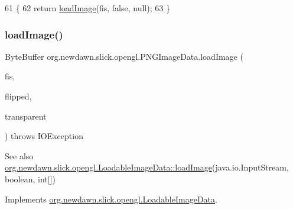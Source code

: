 \begin{DoxyCode}
61                                                                     \{
62         \textcolor{keywordflow}{return} \mbox{\hyperlink{classorg_1_1newdawn_1_1slick_1_1opengl_1_1_p_n_g_image_data_ad5507c5228d071b2936b8aa91f18e9e1}{loadImage}}(fis, \textcolor{keyword}{false}, null);
63     \}
\end{DoxyCode}
\mbox{\label{classorg_1_1newdawn_1_1slick_1_1opengl_1_1_p_n_g_image_data_a9a005163153012911fd6a209ae5f2613}} 
\subsubsection{\texorpdfstring{load\+Image()}{loadImage()}\hspace{0.1cm}{\footnotesize\ttfamily [2/3]}}
{\footnotesize\ttfamily Byte\+Buffer org.\+newdawn.\+slick.\+opengl.\+P\+N\+G\+Image\+Data.\+load\+Image (\begin{DoxyParamCaption}\item[{Input\+Stream}]{fis,  }\item[{boolean}]{flipped,  }\item[{int \mbox{[}$\,$\mbox{]}}]{transparent }\end{DoxyParamCaption}) throws I\+O\+Exception\hspace{0.3cm}{\ttfamily [inline]}}

\begin{DoxySeeAlso}{See also}
\mbox{\hyperlink{interfaceorg_1_1newdawn_1_1slick_1_1opengl_1_1_loadable_image_data_a640021b955dde7deeeeabb5ac3738d2b}{org.\+newdawn.\+slick.\+opengl.\+Loadable\+Image\+Data\+::load\+Image}}(java.\+io.\+Input\+Stream, boolean, int\mbox{[}\mbox{]}) 
\end{DoxySeeAlso}


Implements \mbox{\hyperlink{interfaceorg_1_1newdawn_1_1slick_1_1opengl_1_1_loadable_image_data_a448a235d1058316349f513a69f593d9b}{org.\+newdawn.\+slick.\+opengl.\+Loadable\+Image\+Data}}.


